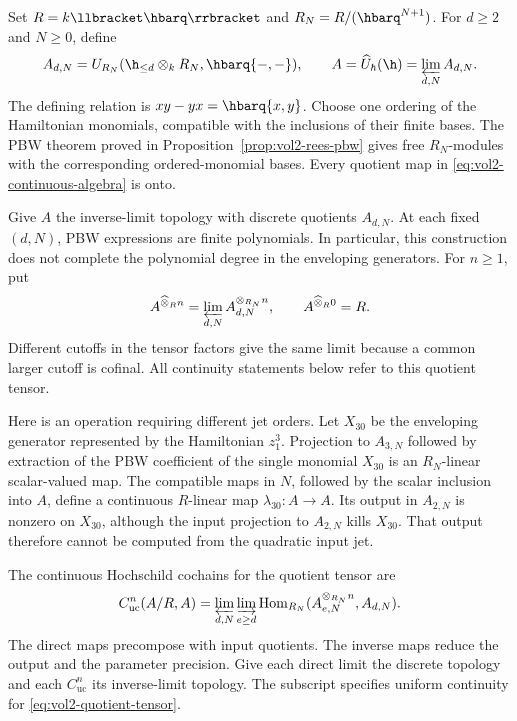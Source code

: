 Set $R=k\llbracket\hbarq\rrbracket$ and
$R_N=R/(\hbarq^{N+1})$. For $d\geq2$ and $N\geq0$, define
\begin{equation}\label{eq:vol2-continuous-algebra}
 A_{d,N}=U_{R_N}(\h_{\leq d}\otimes_kR_N,\hbarq\{-,-\}),
 \qquad A=\widehat U_\hbar(\h)=\varprojlim_{d,N}A_{d,N}.
\end{equation}
The defining relation is $xy-yx=\hbarq\{x,y\}$. Choose one ordering
of the Hamiltonian monomials, compatible with the inclusions of
their finite bases. The PBW theorem proved in
Proposition~\ref{prop:vol2-rees-pbw} gives free $R_N$-modules with
the corresponding ordered-monomial bases. Every quotient map in
\eqref{eq:vol2-continuous-algebra} is onto.

Give $A$ the inverse-limit topology with discrete quotients $A_{d,N}$.
At each fixed $(d,N)$, PBW expressions are finite polynomials.
In particular, this construction does not complete the polynomial
degree in the enveloping generators. For $n\geq1$, put
\begin{equation}\label{eq:vol2-quotient-tensor}
 A^{\widehat\otimes_R n}
  =\varprojlim_{d,N}A_{d,N}^{\otimes_{R_N}n},
 \qquad A^{\widehat\otimes_R0}=R.
\end{equation}
Different cutoffs in the tensor factors give the same limit because
a common larger cutoff is cofinal. All continuity statements below
refer to this quotient tensor.

Here is an operation requiring different jet orders. Let $X_{30}$
be the enveloping generator represented by the Hamiltonian $z_1^3$.
Projection to $A_{3,N}$ followed by extraction of the PBW coefficient
of the single monomial $X_{30}$ is an $R_N$-linear scalar-valued map.
The compatible maps in $N$, followed by the scalar inclusion into
$A$, define a continuous $R$-linear map $\lambda_{30}:A\to A$.
Its output in $A_{2,N}$ is nonzero on $X_{30}$, although the
input projection to $A_{2,N}$ kills $X_{30}$. That output therefore
cannot be computed from the quadratic input jet.

\begin{definition}\label{def:vol2-uniform-cochains}
The continuous Hochschild cochains for the quotient tensor are
\begin{equation}\label{eq:vol2-two-index-cochains}
 C^n_{\mathrm{uc}}(A/R,A)
   =\varprojlim_{d,N}\varinjlim_{e\geq d}
       \operatorname{Hom}_{R_N}
       (A_{e,N}^{\otimes_{R_N}n},A_{d,N}).
\end{equation}
The direct maps precompose with input quotients. The inverse maps
reduce the output and the parameter precision. Give each direct
limit the discrete topology and each $C^n_{\mathrm{uc}}$ its
inverse-limit topology. The subscript specifies uniform continuity
for \eqref{eq:vol2-quotient-tensor}.
\end{definition}

